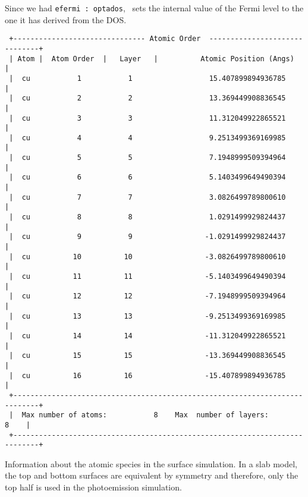 \documentclass[a4paper,11pt,twoside]{book}
\begin{document}
\begin{enumerate}
\begin{verbatim}
\end{verbatim}

Since we had \verb#efermi : optados#, \optados\ sets the internal value of the Fermi level to the one it has derived from the DOS.

\begin{verbatim}
 +------------------------------- Atomic Order  ------------------------------+
 | Atom |  Atom Order  |   Layer   |          Atomic Position (Angs)          |
 |  cu           1           1                  15.407899894936785            |
 |  cu           2           2                  13.369449908836545            |
 |  cu           3           3                  11.312049922865521            |
 |  cu           4           4                  9.2513499369169985            |
 |  cu           5           5                  7.1948999509394964            |
 |  cu           6           6                  5.1403499649490394            |
 |  cu           7           7                  3.0826499789800610            |
 |  cu           8           8                  1.0291499929824437            |
 |  cu           9           9                 -1.0291499929824437            |
 |  cu          10          10                 -3.0826499789800610            |
 |  cu          11          11                 -5.1403499649490394            |
 |  cu          12          12                 -7.1948999509394964            |
 |  cu          13          13                 -9.2513499369169985            |
 |  cu          14          14                 -11.312049922865521            |
 |  cu          15          15                 -13.369449908836545            |
 |  cu          16          16                 -15.407899894936785            |
 +----------------------------------------------------------------------------+
 |  Max number of atoms:           8    Max  number of layers:           8    |
 +----------------------------------------------------------------------------+
\end{verbatim}

Information about the atomic species in the surface simulation. In a slab model, the top and bottom surfaces are equivalent by symmetry and therefore, only the top half is used in the photoemission simulation.


\end{enumerate}
\end{document}
